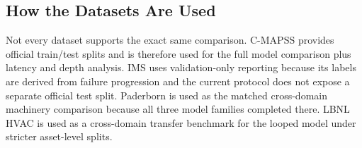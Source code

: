 \subsection{How the Datasets Are Used}
Not every dataset supports the exact same comparison. C-MAPSS provides official train/test splits and is therefore used for the full model comparison plus latency and depth analysis. IMS uses validation-only reporting because its labels are derived from failure progression and the current protocol does not expose a separate official test split. Paderborn is used as the matched cross-domain machinery comparison because all three model families completed there. LBNL HVAC is used as a cross-domain transfer benchmark for the looped model under stricter asset-level splits.
